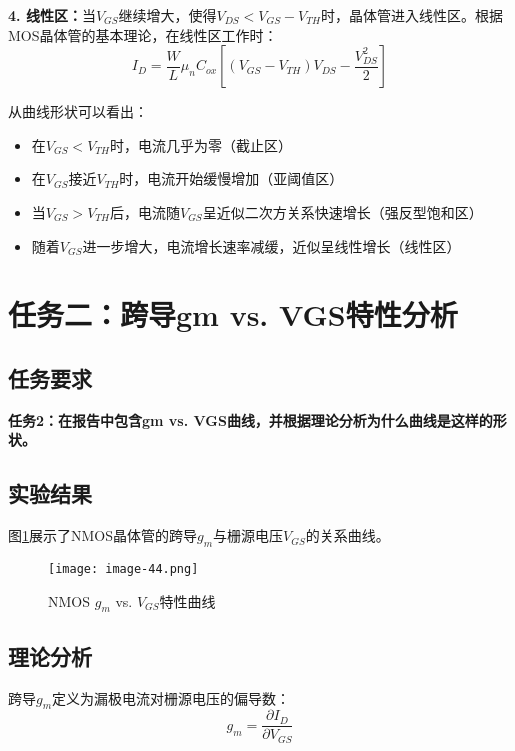 \documentclass[UTF8,12pt,a4paper]{ctexart}
\begin{document}
\textbf{4. 线性区：}当$V_{GS}$继续增大，使得$V_{DS} < V_{GS} - V_{TH}$时，晶体管进入线性区。根据MOS晶体管的基本理论，在线性区工作时：
\begin{equation}
I_D = \frac{W}{L} \mu_n C_{ox}\left[(V_{GS}-V_{TH})V_{DS} - \frac{V_{DS}^2}{2}\right]
\end{equation}

从曲线形状可以看出：
\begin{itemize}
\item 在$V_{GS} < V_{TH}$时，电流几乎为零（截止区）
\item 在$V_{GS}$接近$V_{TH}$时，电流开始缓慢增加（亚阈值区）
\item 当$V_{GS} > V_{TH}$后，电流随$V_{GS}$呈近似二次方关系快速增长（强反型饱和区）
\item 随着$V_{GS}$进一步增大，电流增长速率减缓，近似呈线性增长（线性区）
\end{itemize}

\newpage
\section{任务二：跨导gm vs. VGS特性分析}

\subsection{任务要求}
\textbf{任务2：在报告中包含gm vs. VGS曲线，并根据理论分析为什么曲线是这样的形状。}

\subsection{实验结果}
图\ref{fig:task2}展示了NMOS晶体管的跨导$g_m$与栅源电压$V_{GS}$的关系曲线。

\begin{figure}[h]
\centering
\texttt{[image: image-44.png]}
\caption{NMOS $g_m$ vs. $V_{GS}$特性曲线}
\label{fig:task2}
\end{figure}

\subsection{理论分析}
跨导$g_m$定义为漏极电流对栅源电压的偏导数：
\begin{equation}
g_m = \frac{\partial I_D}{\partial V_{GS}}
\end{equation}
\end{document}
